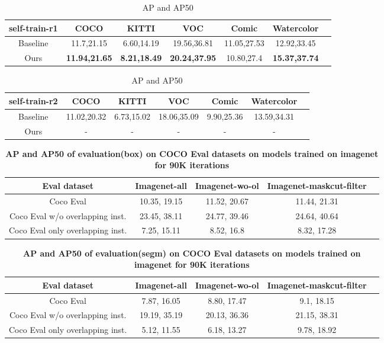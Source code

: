 \begin{table}[htbp]
	\centering
	\begin{tabular}{c|c|c|c|c|cl}
		\toprule
		self-train-r1 & COCO & KITTI & VOC & Comic & Watercolor \\ \midrule
		Baseline & 11.7,21.15 & 6.60,14.19 & 19.56,36.81 & 11.05,27.53 & 12.92,33.45 \\ \midrule
		Ours & \textbf{11.94,21.65} & \textbf{8.21,18.49} & \textbf{20.24,37.95} & 10.80,27.4 & \textbf{15.37,37.74} \\ \bottomrule
	\end{tabular}
	\caption{AP and AP50}
	\label{tab:r1_train}
\end{table}

\begin{table}[htbp]
	\centering
	\begin{tabular}{c|c|c|c|c|cl}
		\toprule
		self-train-r2 & COCO & KITTI & VOC & Comic & Watercolor \\ \midrule
		Baseline & 11.02,20.32 & 6.73,15.02 & 18.06,35.09 & 9.90,25.36 & 13.59,34.31 \\ \midrule
		Ours & - & - & - & - & - \\ \bottomrule
	\end{tabular}
	\caption{AP and AP50}
	\label{tab:r2_train}
\end{table}

\begin{table}[htbp]
	\centering
	\begin{tabular}{c|c|c|cl}
		\toprule
		Eval dataset & Imagenet-all & Imagenet-wo-ol & Imagenet-maskcut-filter \\
		\midrule
		Coco Eval & 10.35, 19.15 & 11.52, 20.67 & 11.44, 21.31 \\
		\midrule
		Coco Eval w/o overlapping inst. & 23.45, 38.11  & 24.77, 39.46 & 24.64, 40.64 \\
		\midrule
		Coco Eval only overlapping inst. & 7.25, 15.11 & 8.52, 16.8 & 8.32, 17.28 \\
		\bottomrule
	\end{tabular}
	\caption{\textbf{AP and AP50 of evaluation(box) on COCO Eval datasets on models trained on imagenet for 90K iterations}}
	\label{tab:ablationK}
\end{table}

\begin{table}[htbp]
	\centering
	\begin{tabular}{c|c|c|cl}
		\toprule
		Eval dataset & Imagenet-all & Imagenet-wo-ol & Imagenet-maskcut-filter \\
		\midrule
		Coco Eval & 7.87, 16.05 & 8.80, 17.47 & 9.1, 18.15 \\
		\midrule
		Coco Eval w/o overlapping inst. & 19.19, 35.19  & 20.13, 36.36 & 21.15, 38.31 \\
		\midrule
		Coco Eval only overlapping inst. & 5.12, 11.55 & 6.18, 13.27 & 9.78, 18.92 \\
		\bottomrule
	\end{tabular}
	\caption{\textbf{AP and AP50 of evaluation(segm) on COCO Eval datasets on models trained on imagenet for 90K iterations}}
	\label{tab:ablationK}
\end{table}

